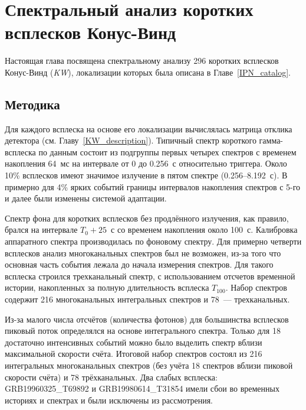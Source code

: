 \chapter{Спектральный анализ коротких всплесков Конус-Винд} \label{sGRB_spectral_catalog}
Настоящая глава посвящена спектральному анализу 296 коротких всплесков Конус-Винд (\textit{KW}),
локализации которых была описана в Главе~\ref{IPN_catalog}.

\section{Методика}
Для каждого всплеска на основе его локализации вычислялась матрица отклика детектора
(см. Главу~\ref{KW_description}).
Типичный спектр короткого гамма-всплеска по данным \kws состоит из подгруппы первых 
четырех спектров с временем накопления 64~мс на интервале 
от 0 до 0.256~с относительно триггера. Около 10\% всплесков имеют значимое 
излучение в пятом спектре (0.256--8.192~с). В примерно для 4\% ярких событий
границы интервалов накопления спектров с 5-го и далее были изменены системой адаптации.

Спектр фона для коротких всплесков без продлённого излучения, как правило, 
брался на интервале $T_0+25$~с со временем накопления около 100~с.
Калибровка аппаратного спектра производилась по фоновому спектру.
Для примерно четверти всплесков анализ многоканальных спектров был не возможен, из-за того 
что основная часть события лежала до начала измерения спектров. 
Для такого всплеска строился трехканальный спектр, с использованием отсчетов временной истории, 
накопленных за полную длительность всплеска $T_{100}$.
Набор спектров содержит 216 многоканальных интегральных спектров и 78~--- трехканальных. 

Из-за малого числа отсчётов (количества фотонов) для большинства всплесков 
пиковый поток определялся на основе интегрального спектра. 
Только для 18 достаточно интенсивных событий можно было выделить спектр вблизи 
максимальной скорости счёта.
Итоговой набор спектров состоял из 216 интегральных многоканальных спектров 
(без учёта 18 спектров вблизи пиковой скорости счёта) и 78 трёхканальных. 
Два слабых всплеска: GRB19960325\_T69892 и GRB19980614\_T31854 имели сбои во 
временных историях и спектрах и были исключены из рассмотрения.

